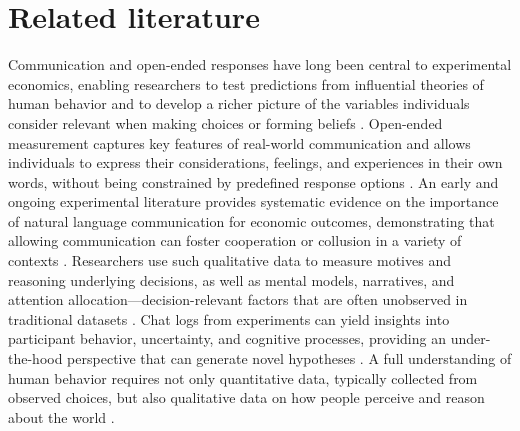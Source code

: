\documentclass[11pt]{article}
\begin{document}
\begin{sloppypar}
\section{Related literature}\label{s-related}

Communication and open-ended responses have long been central to experimental economics, enabling researchers to test predictions from influential theories of human behavior and to develop a richer picture of the variables individuals consider relevant when making choices or forming beliefs \citep{haaland2025understanding}. Open-ended measurement captures key features of real-world communication and allows individuals to express their considerations, feelings, and experiences in their own words, without being constrained by predefined response options \citep{haaland2025understanding}. An early and ongoing experimental literature provides systematic evidence on the importance of natural language communication for economic outcomes, demonstrating that allowing communication can foster cooperation or collusion in a variety of contexts \citep{Houser2007, Andreoni2011, brandts_cooper_2025, Baranski2023, Zultan2012}. Researchers use such qualitative data to measure motives and reasoning underlying decisions, as well as mental models, narratives, and attention allocation—decision-relevant factors that are often unobserved in traditional datasets \citep{haaland2025understanding, ChopraHaaland2023}. Chat logs from experiments can yield insights into participant behavior, uncertainty, and cognitive processes, providing an under-the-hood perspective that can generate novel hypotheses \citep{ling2025underreporting}. A full understanding of human behavior requires not only quantitative data, typically collected from observed choices, but also qualitative data on how people perceive and reason about the world \citep{ChopraHaaland2023}.


\end{sloppypar}
\end{document}
